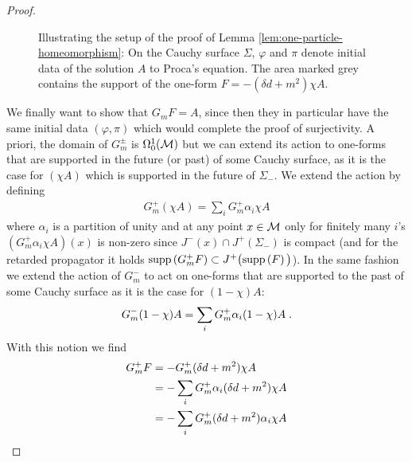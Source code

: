 \begin{proof}
\begin{figure}[]
	\begin{center}
	\end{center}
	\caption{Illustrating the setup of the proof of Lemma \ref{lem:one-particle-homeomorphism}: On the Cauchy surface $\Sigma$, $\varphi$ and $\pi$ denote initial data of the solution $A$ to Proca's equation. The area marked grey contains the support of the one-form $F = -(\delta d + m^2) \chi A$.}
	\label{fig:init_data_chi}
\end{figure}
We finally want to show that $G_m F = A$, since then they in particular have the same initial data $(\varphi, \pi)$ which would complete the proof of surjectivity.
A priori, the domain of $G_m^\pm$ is $\Omega^1_0(\mathcal{M})$ but we can extend its action to one-forms that are supported in the future (or past) of some Cauchy surface, as it is the case for $(\chi A)$ which is supported in the future of $\Sigma_-$. We extend the action by defining
\begin{align}
	G_m^+(\chi A) = \sum\limits_i  G_m^+ \alpha_i \chi A
\end{align}
where $\alpha_i$ is a partition of unity and at any point $x \in \mathcal{M}$ only for finitely many $i$'s $\left( G_m^+ \alpha_i \chi A\right)(x)$ is non-zero since $J^- (x) \cap J^+(\Sigma_-)$ is compact (and for the retarded propagator it holds $\text{\upshape{supp}}\left(G_m^+ F\right) \subset J^+\big( \text{\upshape{supp}}\left(F\right)\big)$). In the same fashion we extend the action of $G_m^-$ to act on one-forms that are supported to the past of some Cauchy surface as it is the case for $(1-\chi)A$:
\begin{align}
	G_m^-(1-\chi)A = \sum\limits_i  G_m^+ \alpha_i (1-\chi) A \;.
\end{align}
With this notion we find
\begin{align}
	G_m^+ F
	&= - G_m^+ (\delta d + m^2) \chi A \notag\\
	&= -  \sum_i G_m^+ \alpha_i (\delta d + m^2) \chi A\notag \\
	&= -  \sum_i G_m^+  (\delta d + m^2) \alpha_i \chi A \notag\\

\end{align}
\end{proof}
